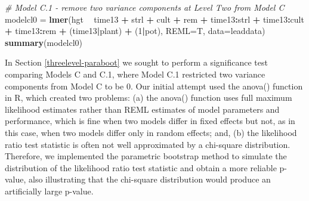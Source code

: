 \documentclass[
]{krantz}
\newenvironment{Shaded}{\begin{snugshade}}{\end{snugshade}}
\newcommand{\CommentTok}[1]{\textcolor[rgb]{0.37,0.37,0.37}{\textit{#1}}}
\newcommand{\DataTypeTok}[1]{\textcolor[rgb]{0.27,0.27,0.27}{#1}}
\newcommand{\DecValTok}[1]{\textcolor[rgb]{0.06,0.06,0.06}{#1}}
\newcommand{\KeywordTok}[1]{\textcolor[rgb]{0.27,0.27,0.27}{\textbf{#1}}}
\newcommand{\NormalTok}[1]{#1}
\newcommand{\OperatorTok}[1]{\textcolor[rgb]{0.43,0.43,0.43}{\textbf{#1}}}
\newcommand{\StringTok}[1]{\textcolor[rgb]{0.5,0.5,0.5}{#1}}
\begin{document}
\begin{Shaded}
\begin{Highlighting}[]
\CommentTok{# Model C.1 - remove two variance components at Level Two from Model C}
\NormalTok{modelcl0 =}\StringTok{ }\KeywordTok{lmer}\NormalTok{(hgt }\OperatorTok{~}\StringTok{ }\NormalTok{time13 }\OperatorTok{+}\StringTok{ }\NormalTok{strl }\OperatorTok{+}\StringTok{ }\NormalTok{cult }\OperatorTok{+}\StringTok{ }\NormalTok{rem }\OperatorTok{+}\StringTok{ }\NormalTok{time13}\OperatorTok{:}\NormalTok{strl }\OperatorTok{+}
\StringTok{  }\NormalTok{time13}\OperatorTok{:}\NormalTok{cult }\OperatorTok{+}\StringTok{ }\NormalTok{time13}\OperatorTok{:}\NormalTok{rem }\OperatorTok{+}\StringTok{ }\NormalTok{(time13}\OperatorTok{|}\NormalTok{plant) }\OperatorTok{+}\StringTok{ }\NormalTok{(}\DecValTok{1}\OperatorTok{|}\NormalTok{pot),}
  \DataTypeTok{REML=}\NormalTok{T, }\DataTypeTok{data=}\NormalTok{leaddata)}
\KeywordTok{summary}\NormalTok{(modelcl0)}
\end{Highlighting}
\end{Shaded}

In Section \ref{threelevel-paraboot} we sought to perform a significance test comparing Models C and C.1, where Model C.1 restricted two variance components from Model C to be 0. Our initial attempt used the anova() function in R, which created two problems: (a) the anova() function uses full maximum likelihood estimates rather than REML estimates of model parameters and performance, which is fine when two models differ in fixed effects but not, as in this case, when two models differ only in random effects; and, (b) the likelihood ratio test statistic is often not well approximated by a chi-square distribution. Therefore, we implemented the parametric bootstrap method to simulate the distribution of the likelihood ratio test statistic and obtain a more reliable p-value, also illustrating that the chi-square distribution would produce an artificially large p-value.
\end{document}
